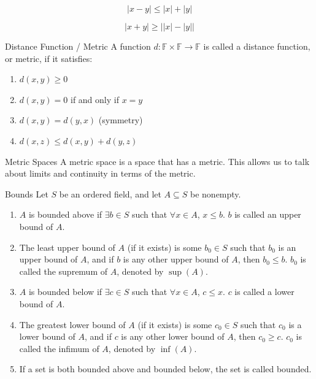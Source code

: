 \documentclass[12pt]{article}
\begin{document}
\begin{corollary}{}{}
    \[ | x - y | \leq | x | + | y | \]
\end{corollary}
\begin{corollary}{}{}
    \[ | x + y | \geq \left| | x | - | y | \right| \]
\end{corollary}
\begin{definition}{Distance Function / Metric}{}
    A function $ d : \mathbb{F} \times \mathbb{F} \to \mathbb{F} $ is called a distance function, or metric, if it satisfies:
    \begin{enumerate}
        \item $ d(x, y) \geq 0 $
        \item $ d(x, y) = 0 $ if and only if $ x = y $
        \item $ d(x, y) = d(y, x) $ (symmetry)
        \item $ d(x, z) \leq d(x, y) + d(y, z) $
    \end{enumerate}
\end{definition}
\begin{definition}{Metric Spaces}{}
    A metric space is a space that has a metric. This allows us to talk about limits and continuity in terms of the metric.
\end{definition}
\begin{definition}{Bounds}{}
    Let $ S $ be an ordered field, and let $ A \subseteq S $ be nonempty.
    \begin{enumerate}[label=(\roman*)]
        \item $ A $ is bounded above if $ \exists b \in S $ such that $ \forall x \in A $, $ x \leq b $. $ b $ is called an upper bound of $ A $.
        \item The least upper bound of $ A $ (if it exists) is some $ b_0 \in S $ such that $ b_0 $ is an upper bound of $ A $, and if $ b $ is any other upper bound of $ A $, then $ b_0 \leq b $. $ b_0 $ is called the supremum of $ A $, denoted by $ \sup (A) $.
        \item $ A $ is bounded below if $ \exists c \in S $ such that $ \forall x \in A $, $ c \leq x $. $ c $ is called a lower bound of $ A $.
        \item The greatest lower bound of $ A $ (if it exists) is some $ c_0 \in S $ such that $ c_0 $ is a lower bound of $ A $, and if $ c $ is any other lower bound of $ A $, then $ c_0 \geq c $. $ c_0 $ is called the infimum of $ A $, denoted by $ \inf (A) $.
        \item If a set is both bounded above and bounded below, the set is called bounded.
    \end{enumerate}
\end{definition}
\end{document}
